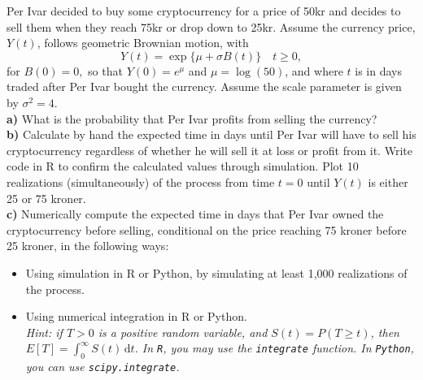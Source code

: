 \documentclass[1p]{article}		%
\begin{document}
\noindent
Per Ivar decided to buy some cryptocurrency for a price of 50kr and decides to sell them when they reach 75kr or drop down to 25kr. Assume the currency price, $Y(t)$, follows geometric Brownian motion, with
$$ Y(t) = \exp\{\mu + \sigma B(t)\} \quad t \geq 0, $$
for $B(0) = 0,$ so that $Y(0) = e^\mu$ and $\mu = \log(50)$, and where $t$ is in days traded after Per Ivar bought the currency. Assume the scale parameter is given by $\sigma^2=4$.\\

\noindent
\textbf{a)} What is the probability that Per Ivar profits from selling the currency?\\

\noindent
\textbf{b)} Calculate by hand the expected time in days until Per Ivar will have to sell his cryptocurrency regardless of whether he will sell it at loss or profit from it. Write code in R to confirm the calculated values through simulation. Plot 10 realizations (simultaneously) of the process from time $t=0$ until $Y(t)$ is either 25 or 75 kroner.\\

\noindent
\textbf{c)} Numerically compute the expected time in days that Per Ivar owned the cryptocurrency before selling, conditional on the price reaching 75 kroner before 25 kroner, in the following ways:
\begin{itemize}
\item Using simulation in R or Python, by simulating at least 1,000 realizations of the process.
\item Using numerical integration in R or Python.\\
\emph{Hint: if $T>0$ is a positive random variable, and $S(t) = P(T \geq t)$, then $E[T] = \int_0^\infty S(t) \, \mathrm{d}t$. In \texttt{R}, you may use the \texttt{integrate} function. In \texttt{Python}, you can use \texttt{scipy.integrate}.}
\end{itemize}
\end{document}
